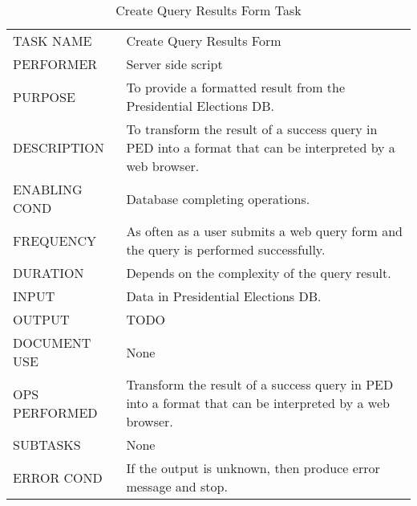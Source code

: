 \documentclass{article}
\begin{document}
\begin{table}[h!]
  \centering
  \caption{Create Query Results Form Task}
  \label{tab:table7}
  \begin{tabular}{lp{10cm}}
       \hline
     TASK NAME & Create Query Results Form\\
     PERFORMER & Server side script\\
     PURPOSE & To provide a formatted result from the Presidential Elections DB.\\
     DESCRIPTION & To transform the result of a success query in PED into a format that can be interpreted by a web browser.\\
     ENABLING COND & Database completing operations.\\
     FREQUENCY & As often as a user submits a web query form and the query is performed successfully.\\
     DURATION & Depends on the complexity of the query result.\\
     INPUT & Data in Presidential Elections DB.\\
     OUTPUT &  {\color{red}TODO}\\
     DOCUMENT USE & None\\
     OPS PERFORMED &  Transform the result of a success query in PED into a format that can be interpreted by a web browser.\\
     SUBTASKS & None\\
     ERROR COND &  If the output is unknown, then produce error message and stop.\\
       \hline
  \end{tabular}
\end{table}
\end{document}
